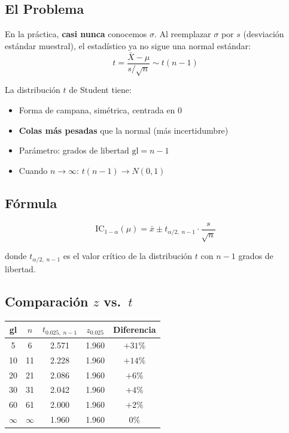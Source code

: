 \documentclass[11pt, a4paper]{article}
\begin{document}
\subsection{El Problema}

En la pr\'actica, \textbf{casi nunca} conocemos $\sigma$. Al reemplazar $\sigma$ por $s$ (desviaci\'on est\'andar muestral), el estad\'istico ya no sigue una normal est\'andar:
\[
t = \frac{\bar{X} - \mu}{s/\sqrt{n}} \sim t(n-1)
\]

La distribuci\'on $t$ de Student tiene:
\begin{itemize}
  \item Forma de campana, sim\'etrica, centrada en 0
  \item \textbf{Colas m\'as pesadas} que la normal (m\'as incertidumbre)
  \item Par\'ametro: grados de libertad $\text{gl} = n - 1$
  \item Cuando $n \to \infty$: $t(n-1) \to N(0,1)$
\end{itemize}

\subsection{F\'ormula}

\[
\boxed{\text{IC}_{1-\alpha}(\mu) = \bar{x} \pm t_{\alpha/2,\; n-1} \cdot \frac{s}{\sqrt{n}}}
\]

donde $t_{\alpha/2,\; n-1}$ es el valor cr\'itico de la distribuci\'on $t$ con $n-1$ grados de libertad.

\subsection{Comparaci\'on $z$ vs.\ $t$}

\begin{center}
\begin{tabular}{ccccc}
\toprule
\textbf{gl} & $n$ & $t_{0.025,\; n-1}$ & $z_{0.025}$ & Diferencia \\
\midrule
5  & 6   & 2.571 & 1.960 & $+31\%$ \\
10 & 11  & 2.228 & 1.960 & $+14\%$ \\
20 & 21  & 2.086 & 1.960 & $+6\%$ \\
30 & 31  & 2.042 & 1.960 & $+4\%$ \\
60 & 61  & 2.000 & 1.960 & $+2\%$ \\
$\infty$ & $\infty$ & 1.960 & 1.960 & $0\%$ \\
\bottomrule
\end{tabular}
\end{center}
\end{document}
